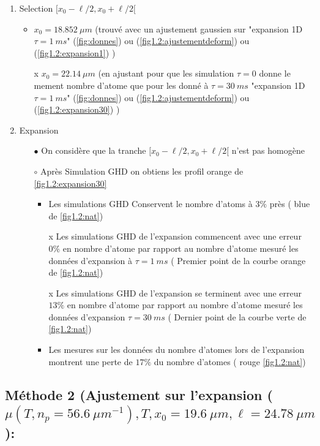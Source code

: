 \documentclass[a3, 10pt,twoside]{article}          %
\theoremstyle{plain}
\theoremstyle{definition}
\theoremstyle{remark}
\theoremstyle{definition} %
\def\OliveGreen{OliveGreen}
\begin{document}
\begin{enumerate}[label =\Alph*)]
				\item Selection $[ x_0 - \ell/2 , x_0 + \ell/2[$ 
					\begin{itemize}
								\item $x_0 = 18.852 ~\mu m $ (trouvé avec un ajustement gaussien sur {\color{OliveGreen}"expansion 1D $\tau =1~ms$" (\ref{fig:donnes})} ou {\color{orange} (\ref{fig1.2:ajustementdeform}) } ou {\color{blue}(\ref{fig1.2:expansion1})} ) 
								\item[x] $x_0 = 22.14 ~ \mu m $ (en ajustant pour que les simulation $ \tau = 0$ donne le mement nombre d'atome que pour les donné à $\tau = 30~ms$  {\color{OliveGreen}"expansion 1D $\tau =1~ms$" (\ref{fig:donnes})} ou {\color{orange} (\ref{fig1.2:ajustementdeform}) } ou {\color{blue}(\ref{fig1.2:expansion30})} )
							\end{itemize}
				\item Expansion 
					\begin{itemize}
								\item[$\bullet$]	 On considère que la tranche $[ x_0 - \ell/2 , x_0 + \ell/2[$ n'est pas homogène 
								\item[$\circ$] Après Simulation GHD on obtiens les profil {\color{orange} orange de \ref{fig1.2:expansion30}}  
									\begin{itemize}
										\item Les simulations GHD Conservent le nombre d'atoms à $3\%$ près ({\color{blue} blue de \ref{fig1.2:nat}})
										\item[x] Les simulations GHD de l'expansion commencent avec une erreur $0\%$ en nombre d'atome par rapport au nombre d'atome mesuré les données d'expansion à $\tau = 1~ms$ ({\color{orange} Premier point de la courbe orange de \ref{fig1.2:nat}}) 
										\item[x] Les simulations GHD de l'expansion se terminent avec une erreur $13\%$ en nombre d'atome par rapport au nombre d'atome mesuré les données d'expansion $\tau = 30~ms$ ({\color{\OliveGreen} Dernier point de la courbe verte de \ref{fig1.2:nat}})
										\item Les mesures sur les données du nombre d'atomes lors de l'expansion montrent une perte de $17\%$ du nombre d'atomes ({\color{red} rouge \ref{fig1.2:nat}})
									\end{itemize}	 	
							\end{itemize}

			\end{enumerate}		
			
	\subsection{Méthode 2 (Ajustement sur l'expansion ($\mu( T , n_p = 56.6 ~{\mu m}^{-1} ) , T , x_0 = 19.6 ~\mu m  , \ell = 24.78 ~ \mu m  $ ): } 
	
\end{document}
